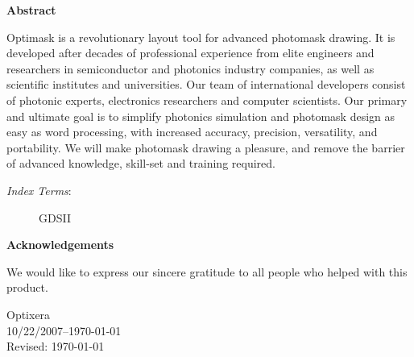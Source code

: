 \resetdatestamp %
\begin{center}\Large \textbf{Abstract} \end{center}
Optimask is a revolutionary layout tool for advanced photomask drawing. It is developed after decades of professional experience from elite engineers and researchers in semiconductor and photonics industry companies, as well as scientific institutes and universities. Our team of international developers consist of photonic experts, electronics researchers and computer scientists. Our primary and ultimate goal is to simplify photonics simulation and photomask design as easy as word processing, with increased accuracy, precision, versatility, and portability. We will make photomask drawing a pleasure, and remove the barrier of advanced knowledge, skill-set and training required.

\vspace*{1em} %
\begin{description}
    \item[\emph{Index Terms}:]
      \small{\acf{GDSII}}
\end{description}
\newpage

\begin{center}\Large \textbf{Acknowledgements}\end{center}

We would like to express our sincere gratitude to all people who helped with this product.

\begin{flushright}
Optixera \\ 10/22/2007--\today \\
Revised: \today \\
\end{flushright}

\newpage

\tableofcontents
\listoftables
{}
\listoffigures
{}
\newpage


\newpage


